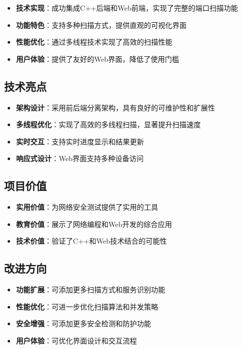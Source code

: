 \documentclass[12pt,hyperref,a4paper,UTF8]{ctexart}
\begin{document}
\begin{itemize}
    \item \textbf{技术实现}：成功集成C++后端和Web前端，实现了完整的端口扫描功能
    \item \textbf{功能特色}：支持多种扫描方式，提供直观的可视化界面
    \item \textbf{性能优化}：通过多线程技术实现了高效的扫描性能
    \item \textbf{用户体验}：提供了友好的Web界面，降低了使用门槛
\end{itemize}

\subsection{技术亮点}
\begin{itemize}
    \item \textbf{架构设计}：采用前后端分离架构，具有良好的可维护性和扩展性
    \item \textbf{多线程优化}：实现了高效的多线程扫描，显著提升扫描速度
    \item \textbf{实时交互}：支持实时进度显示和结果更新
    \item \textbf{响应式设计}：Web界面支持多种设备访问
\end{itemize}

\subsection{项目价值}
\begin{itemize}
    \item \textbf{实用价值}：为网络安全测试提供了实用的工具
    \item \textbf{教育价值}：展示了网络编程和Web开发的综合应用
    \item \textbf{技术价值}：验证了C++和Web技术结合的可能性
\end{itemize}

\subsection{改进方向}
\begin{itemize}
    \item \textbf{功能扩展}：可添加更多扫描方式和服务识别功能
    \item \textbf{性能优化}：可进一步优化扫描算法和并发策略
    \item \textbf{安全增强}：可添加更多安全检测和防护功能
    \item \textbf{用户体验}：可优化界面设计和交互流程
\end{itemize}
\end{document}
